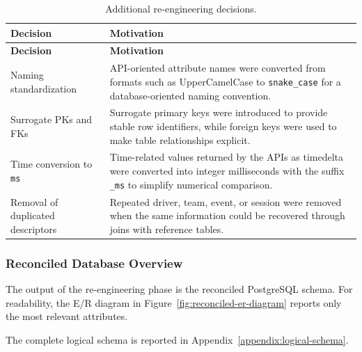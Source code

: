\documentclass[11pt,a4paper]{article}
\begin{document}
	\begin{longtable}{p{4.2cm}p{\dimexpr\linewidth-4.2cm-4\tabcolsep\relax}}
		\caption{Additional re-engineering decisions.}
		\label{tab:reengineering-summary} \\
		
		\toprule
		\textbf{Decision} & \textbf{Motivation} \\
		\midrule
		\endfirsthead
		
		\toprule
		\textbf{Decision} & \textbf{Motivation} \\
		\midrule
		\endhead
		
		\bottomrule
		\endfoot
		
		Naming standardization 
		& API-oriented attribute names were converted from formats such as UpperCamelCase to \texttt{snake\_case} for a database-oriented naming convention. \\
		\midrule
		
		Surrogate PKs and FKs
		& Surrogate primary keys were introduced to provide stable row identifiers, while foreign keys were used to make table relationships explicit. \\
		\midrule
		
		Time conversion to \texttt{ms}
		& Time-related values returned by the APIs as timedelta were converted into integer milliseconds with the suffix \texttt{\_ms} to simplify numerical comparison. \\
		\midrule
		
		Removal of duplicated descriptors
		& Repeated driver, team, event, or session were removed when the same information could be recovered through joins with reference tables. \\
		
	\end{longtable}

	
	

	
	
	\subsubsection{Reconciled Database Overview}
	
	The output of the re-engineering phase is the reconciled PostgreSQL schema. 
	For readability, the E/R diagram in Figure~\ref{fig:reconciled-er-diagram} reports only the most relevant attributes. 
	
	The complete logical schema is reported in Appendix~\ref{appendix:logical-schema}.
	
	\vspace{2em}
	
\end{document}
